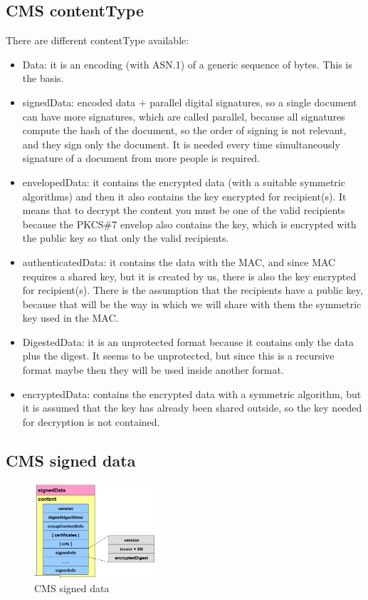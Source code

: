 \subsection{CMS contentType}
There are different contentType available:
\begin{itemize}
  \item Data: it is an encoding (with ASN.1) of a generic sequence of
    bytes. This is the basis.
  \item signedData: encoded data + parallel digital signatures, so a
    single document can have more signatures, which are called
    parallel, because all signatures compute the hash of the document,
    so the order of signing is not relevant, and they sign only the
    document. It is needed every time simultaneously signature of a
    document from more people is required.
  \item envelopedData: it contains the encrypted data (with a suitable
    symmetric algorithms) and then it also contains the key encrypted
    for recipient(s). It means that to decrypt the content you must be
    one of the valid recipients because the PKCS\#7 envelop also
    contains the key, which is encrypted with the public key so that
    only the valid recipients.
  \item authenticatedData: it contains the data with the MAC, and
    since MAC requires a shared key, but it is created by us, there is
    also the key encrypted for recipient(s). There is the assumption
    that the recipients have a public key, because that will be the
    way in which we will share with them the symmetric key used in the
    MAC.
  \item DigestedData: it is an unprotected format because it contains
    only the data plus the digest. It seems to be unprotected, but
    since this is a recursive format maybe then they will be used
    inside another format.
  \item encryptedData: contains the encrypted data with a symmetric
    algorithm, but it is assumed that the key has already been shared
    outside, so the key needed for decryption is not contained.
\end{itemize}


\subsection{CMS signed data}

\begin{figure}[H]
  \centering
  \includegraphics[width=0.4\textwidth]{img/cms signed data.png}
  \caption{CMS signed data}
\end{figure}
